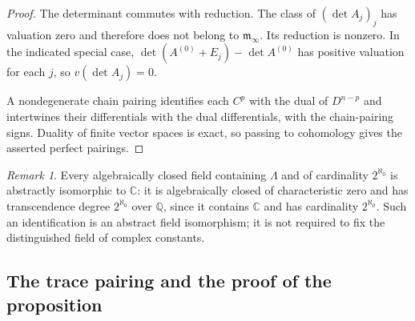 \documentclass[11pt]{article}
\numberwithin{equation}{section}
\theoremstyle{definition}
\theoremstyle{remark}
\newtheorem{remark}[theorem]{Remark}
\newcommand{\Q}{\mathbb Q}
\newcommand{\C}{\mathbb C}
\begin{document}
\begin{proof}
The determinant commutes with reduction.  The class of
$(\det A_j)_j$ has valuation zero and therefore does not belong to
$\mathfrak m_\infty$.  Its reduction is nonzero.  In the indicated
special case,
$\det(A^{(0)}+E_j)-\det A^{(0)}$ has positive valuation for each
$j$, so $v(\det A_j)=0$.

A nondegenerate chain pairing identifies each $C^p$ with the dual of
$D^{n-p}$ and intertwines their differentials with the dual
differentials, with the chain-pairing signs.  Duality of finite
vector spaces is exact, so passing to cohomology gives the asserted
perfect pairings.
\end{proof}

\begin{remark}\label{rem:complex-coefficients}
Every algebraically closed field containing $\Lambda$ and of cardinality
$2^{\aleph_0}$ is abstractly isomorphic to $\C$: it is algebraically
closed of characteristic zero and has transcendence degree
$2^{\aleph_0}$ over $\Q$, since it contains $\C$ and has cardinality
$2^{\aleph_0}$.  Such an identification is an abstract field
isomorphism; it is not required to fix the distinguished field of
complex constants.
\end{remark}

\subsection{The trace pairing and the proof of the proposition}
\end{document}
